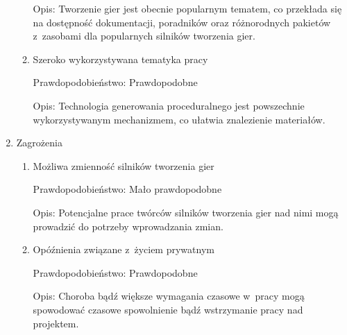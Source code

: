 \begin{enumerate}
\begin{enumerate}
            Opis:  Tworzenie gier jest obecnie popularnym tematem, co przekłada się na dostępność dokumentacji, poradników oraz różnorodnych pakietów z~zasobami dla popularnych silników tworzenia gier.
            \item Szeroko wykorzystywana tematyka pracy 
            
            Prawdopodobieństwo: Prawdopodobne
            
            Opis: Technologia generowania proceduralnego jest powszechnie wykorzystywanym mechanizmem, co ułatwia znalezienie materiałów.
        \end{enumerate}
        
    \item Zagrożenia
        \begin{enumerate}
            \item Możliwa zmienność silników tworzenia gier
            
            Prawdopodobieństwo: Mało prawdopodobne
            
            Opis: Potencjalne prace twórców silników tworzenia gier nad nimi mogą prowadzić do potrzeby wprowadzania zmian.
            \item Opóźnienia związane z~życiem prywatnym  
            
            Prawdopodobieństwo: Prawdopodobne
            
            Opis: Choroba bądź większe wymagania czasowe w~pracy mogą spowodować czasowe spowolnienie bądź wstrzymanie pracy nad projektem.
        \end{enumerate}
\end{enumerate}
